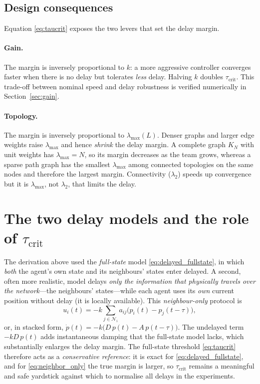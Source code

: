\documentclass[11pt,a4paper]{article}
\newcommand{\Lap}{L}
\newcommand{\taucrit}{\tau_{\mathrm{crit}}}
\newcommand{\lammax}{\lambda_{\max}}
\begin{document}
\subsection{Design consequences}

Equation \eqref{eq:taucrit} exposes the two levers that set the delay margin.

\paragraph{Gain.} The margin is inversely proportional to $k$: a more aggressive controller
converges faster when there is no delay but tolerates \emph{less} delay. Halving $k$ doubles
$\taucrit$. This trade-off between nominal speed and delay robustness is verified numerically
in Section~\ref{sec:gain}.

\paragraph{Topology.} The margin is inversely proportional to $\lammax(\Lap)$. Denser graphs
and larger edge weights raise $\lammax$ and hence \emph{shrink} the delay margin. A complete
graph $K_N$ with unit weights has $\lammax=N$, so its margin decreases as the team grows,
whereas a sparse path graph has the smallest $\lammax$ among connected topologies on the same
nodes and therefore the largest margin. Connectivity ($\lambda_2$) speeds up convergence but
it is $\lammax$, not $\lambda_2$, that limits the delay.

\section{The two delay models and the role of $\taucrit$}
\label{sec:roles}

The derivation above used the \emph{full-state} model \eqref{eq:delayed_fullstate}, in which
\emph{both} the agent's own state and its neighbours' states enter delayed. A second, often
more realistic, model delays \emph{only the information that physically travels over the
network}---the neighbours' states---while each agent uses its \emph{own} current position
without delay (it is locally available). This \emph{neighbour-only} protocol is
\begin{equation}
u_i(t) = -k\sum_{j\in\mathcal N_i} a_{ij}\bigl(p_i(t) - p_j(t-\tau)\bigr),
\label{eq:neighbor_only}
\end{equation}
or, in stacked form, $\dot p(t) = -k\bigl(D\,p(t) - A\,p(t-\tau)\bigr)$. The undelayed term
$-kD\,p(t)$ adds instantaneous damping that the full-state model lacks, which substantially
enlarges the delay margin. The full-state threshold \eqref{eq:taucrit} therefore acts as a
\emph{conservative reference}: it is exact for \eqref{eq:delayed_fullstate}, and for
\eqref{eq:neighbor_only} the true margin is larger, so $\taucrit$ remains a meaningful and safe
yardstick against which to normalise all delays in the experiments.
\end{document}
